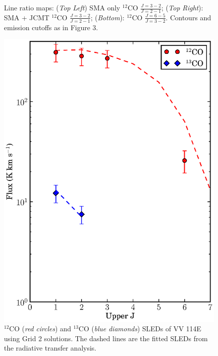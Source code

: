 \begin{figure}[h]
\caption[Line ratio maps]{Line ratio maps: (\textit{Top Left}) SMA only $^{12}$CO $\frac{J=3-2}{J=2-1}$; (\textit{Top Right}): SMA + JCMT  $^{12}$CO $\frac{J=3-2}{J=2-1}$; (\textit{Bottom}):  $^{12}$CO $\frac{J=6-5}{J=3-2}$. Contours and emission cutoffs as in Figure 3. }
\label{RatioMaps}
\end{figure}

\begin{figure}[h] %
\centering
\includegraphics[scale=0.8]{Chapter-2/Figures/fig4_cosled.eps} 
\caption[]{$^{12}$CO (\textit{red circles}) and $^{13}$CO (\textit{blue diamonds}) SLEDs of VV 114E using Grid 2 solutions. The dashed lines are the fitted SLEDs from the radiative transfer analysis.}
\label{cosled}
\end{figure}

